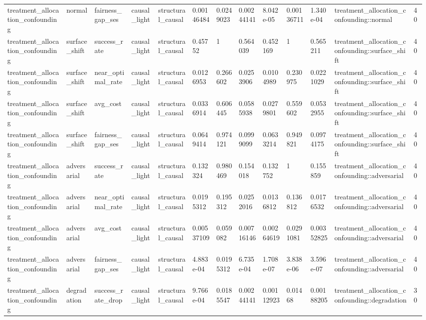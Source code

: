 \begin{tabular}{lllllllllllll}
treatment\_allocation\_confounding & normal & fairness\_gap\_ses & causal\_light & structural\_causal & 0.00146484 & 0.0249023 & 0.00244141 & 8.042e-05 & 0.00136711 & 1.340e-04 & treatment\_allocation\_confounding::normal & 40 \\
treatment\_allocation\_confounding & surface\_shift & success\_rate & causal\_light & structural\_causal & 0.45752 & 1 & 0.564039 & 0.452169 & 1 & 0.565211 & treatment\_allocation\_confounding::surface\_shift & 40 \\
treatment\_allocation\_confounding & surface\_shift & near\_optimal\_rate & causal\_light & structural\_causal & 0.0126953 & 0.266602 & 0.0253906 & 0.0104989 & 0.230975 & 0.0221029 & treatment\_allocation\_confounding::surface\_shift & 40 \\
treatment\_allocation\_confounding & surface\_shift & avg\_cost & causal\_light & structural\_causal & 0.0336914 & 0.606445 & 0.0585938 & 0.0279801 & 0.559602 & 0.0532955 & treatment\_allocation\_confounding::surface\_shift & 40 \\
treatment\_allocation\_confounding & surface\_shift & fairness\_gap\_ses & causal\_light & structural\_causal & 0.0649414 & 0.974121 & 0.0999099 & 0.0633214 & 0.949821 & 0.0974175 & treatment\_allocation\_confounding::surface\_shift & 40 \\
treatment\_allocation\_confounding & adversarial & success\_rate & causal\_light & structural\_causal & 0.132324 & 0.980469 & 0.154018 & 0.132752 & 1 & 0.155859 & treatment\_allocation\_confounding::adversarial & 40 \\
treatment\_allocation\_confounding & adversarial & near\_optimal\_rate & causal\_light & structural\_causal & 0.0195312 & 0.195312 & 0.0252016 & 0.0136812 & 0.136812 & 0.0176532 & treatment\_allocation\_confounding::adversarial & 40 \\
treatment\_allocation\_confounding & adversarial & avg\_cost & causal\_light & structural\_causal & 0.00537109 & 0.059082 & 0.00716146 & 0.00264619 & 0.0291081 & 0.00352825 & treatment\_allocation\_confounding::adversarial & 40 \\
treatment\_allocation\_confounding & adversarial & fairness\_gap\_ses & causal\_light & structural\_causal & 4.883e-04 & 0.0195312 & 6.735e-04 & 1.708e-07 & 3.838e-06 & 3.596e-07 & treatment\_allocation\_confounding::adversarial & 40 \\
treatment\_allocation\_confounding & degradation & success\_rate\_drop & causal\_light & structural\_causal & 9.766e-04 & 0.0185547 & 0.00244141 & 0.00112923 & 0.01468 & 0.00188205 & treatment\_allocation\_confounding::degradation & 30 \\

\end{tabular}
